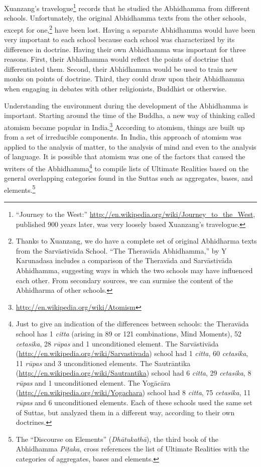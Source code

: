 Xuanzang’s travelogue\footnote{“Journey to the West:” \url{http://en.wikipedia.org/wiki/Journey_to_the_West}, published 900 years later, was very loosely based Xuanzang’s travelogue.} records that he studied the Abhidhamma from different schools. Unfortunately, the original Abhidhamma texts from the other schools, except for one,\footnote{Thanks to Xuanzang, we do have a complete set of original Abhidharma texts from the Sarvāstivāda School. “The Theravāda Abhidhamma,” by Y Karunadasa includes a comparison of the Theravāda and Sarvāstivāda Abhidhamma, suggesting ways in which the two schools may have influenced each other. From secondary sources, we can surmise the content of the Abhidharma of other schools.} have been lost. Having a separate Abhidhamma would have been very important to each school because each school was characterized by its difference in doctrine. Having their own Abhidhamma was important for three reasons. First, their Abhidhamma would reflect the points of doctrine that differentiated them. Second, their Abhidhamma would be used to train new monks on points of doctrine. Third, they could draw upon their Abhidhamma when engaging in debates with other religionists, Buddhist or otherwise.

Understanding the environment during the development of the Abhidhamma is important. Starting around the time of the Buddha, a new way of thinking called atomism became popular in India.\footnote{\url{http://en.wikipedia.org/wiki/Atomism}} According to atomism, things are built up from a set of irreducible components. In India, this approach of atomism was applied to the analysis of matter, to the analysis of mind and even to the analysis of language. It is possible that atomism was one of the factors that caused the writers of the Abhidhamma\footnote{Just to give an indication of the differences between schools: the Theravāda school has 1 \textit{citta} (arising in 89 or 121 combinations, Mind Moments), 52 \textit{cetasika}, 28 \textit{rūpas} and 1 unconditioned element. The Sarvāstivāda (\url{http://en.wikipedia.org/wiki/Sarvastivada}) school had 1 \textit{citta}, 60 \textit{cetasika}, 11 \textit{rūpas} and 3 unconditioned elements. The Sautrāntika (\url{http://en.wikipedia.org/wiki/Sautrantika}) school had 6 \textit{citta}, 29 \textit{cetasika}, 8 \textit{rūpas} and 1 unconditioned element. The Yogācāra (\url{http://en.wikipedia.org/wiki/Yogachara}) school had 8 \textit{citta}, 75 \textit{cetasika}, 11 \textit{rūpas} and 6 unconditioned elements. Each of these schools used the same set of Suttas, but analyzed them in a different way, according to their own doctrines.} to compile lists of Ultimate Realities based on the general overlapping categories found in the Suttas such as aggregates, bases, and elements.\footnote{The “Discourse on Elements” (\textit{Dhātukathā}), the third book of the Abhidhamma \textit{Piṭaka}, cross references the list of Ultimate Realities with the categories of aggregates, bases and elements.}

